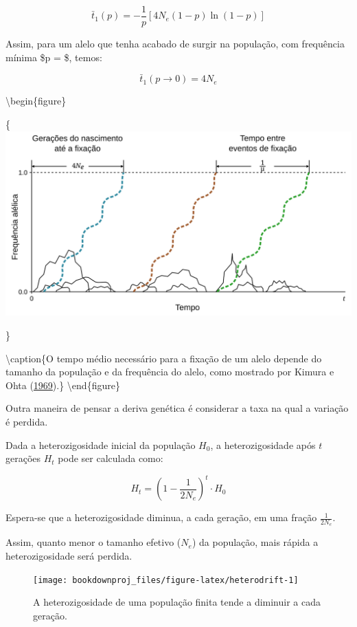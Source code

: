 \documentclass[
]{book}
\begin{document}
\[\bar{t}_1\left(p\right) = - \frac{1}{p} \left[ 4N_e \left( 1-p \right) \ln \left( 1-p \right) \right] \]

Assim, para um alelo que tenha acabado de surgir na população, com frequência mínima \$p =   \$, temos:

\[\bar{t}_1\left(p \rightarrow 0\right) = 4N_e \]

\textbackslash begin\{figure\}

\{\centering \includegraphics[width=800px]{figs/birth_to_fixation}

\}

\textbackslash caption\{O tempo médio necessário para a fixação de um alelo depende do tamanho da população e da frequência do alelo, como mostrado por Kimura e Ohta (\href{https://doi.org/10.1093\%2Fgenetics\%2F61.3.763}{1969}).\}\label{fig:fixationtime}
\textbackslash end\{figure\}

Outra maneira de pensar a deriva genética é considerar a taxa na qual a variação é perdida.

Dada a heterozigosidade inicial da população \(H_0\), a heterozigosidade após \(t\) gerações \(H_t\) pode ser calculada como:

\[H_t = \left( 1- \frac{1}{2N_e}   \right)^t \cdot H_0 \]

Espera-se que a heterozigosidade diminua, a cada geração, em uma fração \(\frac{1}{2N_e}\).

Assim, quanto menor o tamanho efetivo (\(N_e\)) da população, mais rápida a heterozigosidade será perdida.

\begin{figure}

{\centering \texttt{[image: bookdownproj\_files/figure-latex/heterodrift-1]} 

}

\caption{A heterozigosidade de uma população finita tende a diminuir a cada geração.}\label{fig:heterodrift}
\end{figure}
\end{document}
